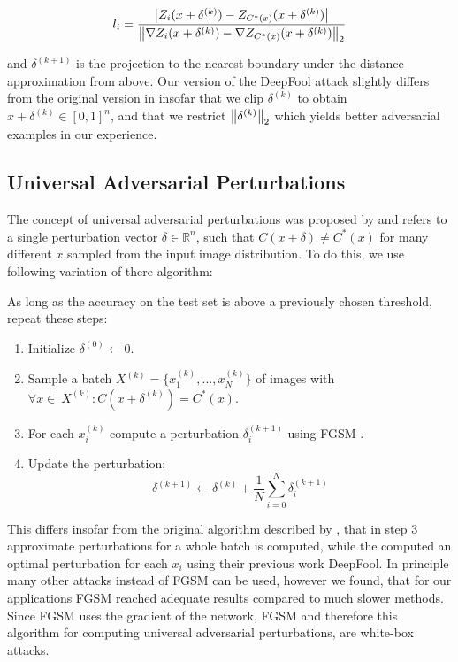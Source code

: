 \begin{equation}
l_i = 
\frac{
	\left \lvert Z_i(x + \delta^{(k)}) - Z_{C^*(x)}(x + \delta^{(k)}) \right \rvert
}
{
	\left \lVert \nabla Z_i(x + \delta^{(k)}) - \nabla Z_{C^*(x)}(x + \delta^{(k)}) \right \rVert _2
}
\end{equation}


and $\delta^{(k+1)}$ is the projection to the nearest boundary under the distance approximation from above. Our version of the DeepFool attack slightly differs from the original version in insofar that we clip $\delta^{(k)}$ to obtain $x + \delta^{(k)} \in [0,1]^n$, and that we restrict $\left \lVert \delta^{(k)} \right \rVert _2$ which yields better adversarial examples in our experience.

\subsection{Universal Adversarial Perturbations}
The concept of universal adversarial perturbations was proposed by \citet{universal} and refers to a single perturbation vector $\delta \in \mathbb{R}^n$, such that $C(x + \delta) \neq C^*(x)$ for many different $x$ sampled from the input image distribution.
To do this, we use following variation of there algorithm:

As long as the accuracy on the test set is above a previously chosen threshold, repeat these steps:
\begin{enumerate}
	\item Initialize $\delta^{(0)} \gets 0$.
	\item Sample a batch $X^{(k)} = \{x_1^{(k)}, ..., x_N^{(k)}\}$ of images with $\forall x \in\ X^{(k)}:  C(x + \delta^{(k)}) = C^*(x)$.
	\item For each $x_i^{(k)}$ compute a perturbation $\delta_i^{(k+1)}$ using FGSM \citep{fgsm}.
	\item Update the perturbation: $$\delta^{(k+1)} \gets \delta^{(k)} + \frac{1}{N} \sum\limits_{i=0}^N \delta_i^{(k+1)}$$
\end{enumerate}

This differs insofar from the original algorithm described by \citet{universal}, that in step 3 approximate perturbations for a whole batch is computed, while the computed an optimal perturbation for each $x_i$ using their previous work DeepFool.  In principle many other attacks instead of FGSM can be used, however we found, that for our applications FGSM reached adequate results compared to much slower methods. Since FGSM uses the gradient of the network, FGSM and therefore this algorithm for computing universal adversarial perturbations, are white-box attacks.
